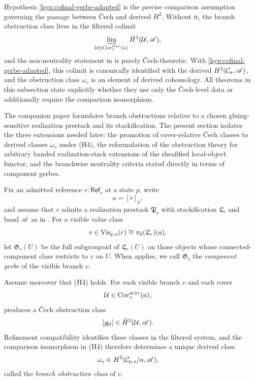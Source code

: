 \begin{remark}\label{rem:cech-vs-derived}
Hypothesis \ref{hyp:cofinal-gerbe-adapted} is the precise comparison assumption governing the passage between \v{C}ech and derived $H^2$. Without it, the branch obstruction class lives in the filtered colimit
\[
\varinjlim_{\mathcal U\in \mathrm{Cov}_v^{\mathrm{acyc}}(a)} \check H^2(\mathcal U,\mathscr{A}),
\]
and the non-neutrality statement in  is purely \v{C}ech-theoretic. With \ref{hyp:cofinal-gerbe-adapted}, this colimit is canonically identified with the derived $H^2(\mathcal C_a,\mathscr{A})$, and the obstruction class $\omega_v$ is an element of derived cohomology. All theorems in this subsection state explicitly whether they use only the \v{C}ech-level data or additionally require the comparison isomorphism.
\end{remark}

\begin{remark}
The companion paper \cite{MaZhang2026ConditionalGluingFailure} formulates branch obstructions relative to a chosen gluing-sensitive realization prestack and its stackification. The present section isolates the three extensions needed later: the promotion of cover-relative \v{C}ech classes to derived classes $\omega_v$ under \textup{(H4)}, the reformulation of the obstruction theory for arbitrary banded realization-stack extensions of the sheafified local-object functor, and the branchwise neutrality criteria stated directly in terms of component gerbes.
\end{remark}

\begin{definition}\label{def:compatible-realization-stack}\label{def:cech-gluing-obstruction}
Fix an admitted reference $r:\mathsf{Ref}_s$ at a state $p$, write
\[
a=[r]_p,
\]
and assume that $r$ admits a realization prestack $\mathfrak P_r$ with stackification $\mathfrak L_r$ and band $\mathscr{A}$ as in . For a visible value class
\[
v\in \mathrm{Vis}_{p,s}(r)\cong \pi_0(\mathfrak L_r)(a),
\]
let $\mathfrak G_v(U)$ be the full subgroupoid of $\mathfrak L_r(U)$ on those objects whose connected-component class restricts to $v$ on $U$. When  applies, we call $\mathfrak G_v$ the \emph{component gerbe} of the visible branch $v$.

Assume moreover that \textup{(H4)} holds. For each visible branch $v$ and each cover
\[
\mathcal U\in \mathrm{Cov}_v^{\mathrm{acyc}}(a),
\]
 produces a \v{C}ech obstruction class
\[
[g_{\mathcal U}]\in \check H^2(\mathcal U,\mathscr{A}).
\]
Refinement compatibility identifies these classes in the filtered system, and the comparison isomorphism in \textup{(H4)} therefore determines a unique derived class
\[
\omega_v\in H^2(\mathcal C_{p,s}/a,\mathscr{A}),
\]
called the \emph{branch obstruction class} of $v$.
\end{definition}

